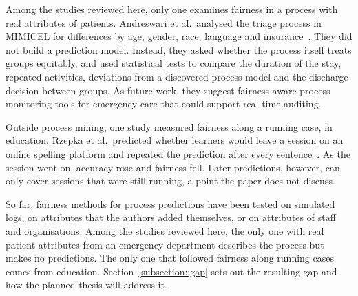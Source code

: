 Among the studies reviewed here, only one examines fairness in a process with real attributes of patients. Andreswari et al.\ analysed the triage process in MIMICEL for differences by age, gender, race, language and insurance~\cite{andreswari2026fairness}. They did not build a prediction model. Instead, they asked whether the process itself treats groups equitably, and used statistical tests to compare the duration of the stay, repeated activities, deviations from a discovered process model and the discharge decision between groups. As future work, they suggest fairness-aware process monitoring tools for emergency care that could support real-time auditing.

Outside process mining, one study measured fairness along a running case, in education. Rzepka et al.\ predicted whether learners would leave a session on an online spelling platform and repeated the prediction after every sentence~\cite{rzepka2022fairness}. As the session went on, accuracy rose and fairness fell. Later predictions, however, can only cover sessions that were still running, a point the paper does not discuss.

So far, fairness methods for process predictions have been tested on simulated logs, on attributes that the authors added themselves, or on attributes of staff and organisations. Among the studies reviewed here, the only one with real patient attributes from an emergency department describes the process but makes no predictions. The only one that followed fairness along running cases comes from education. Section~\ref{subsection::gap} sets out the resulting gap and how the planned thesis will address it.

